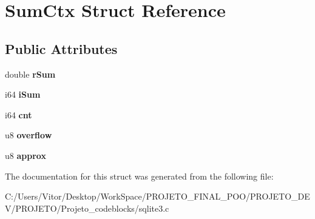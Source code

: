 \hypertarget{struct_sum_ctx}{\section{Sum\-Ctx Struct Reference}
\label{struct_sum_ctx}
}
\subsection*{Public Attributes}
\begin{DoxyCompactItemize}
\item 
\hypertarget{struct_sum_ctx_a1774080b9bcada2f4e867eaf40763f41}{double {\bfseries r\-Sum}}\label{struct_sum_ctx_a1774080b9bcada2f4e867eaf40763f41}

\item 
\hypertarget{struct_sum_ctx_ace6196fb30ebc0687997a723d55683db}{i64 {\bfseries i\-Sum}}\label{struct_sum_ctx_ace6196fb30ebc0687997a723d55683db}

\item 
\hypertarget{struct_sum_ctx_ada00261fe604a7cc6719fdcd8bb5914c}{i64 {\bfseries cnt}}\label{struct_sum_ctx_ada00261fe604a7cc6719fdcd8bb5914c}

\item 
\hypertarget{struct_sum_ctx_a3b14a5da00584aff08314d5e9ddbe9ea}{u8 {\bfseries overflow}}\label{struct_sum_ctx_a3b14a5da00584aff08314d5e9ddbe9ea}

\item 
\hypertarget{struct_sum_ctx_a035a2a22271fee066d9a92d12fe3b9a5}{u8 {\bfseries approx}}\label{struct_sum_ctx_a035a2a22271fee066d9a92d12fe3b9a5}

\end{DoxyCompactItemize}


The documentation for this struct was generated from the following file\-:\begin{DoxyCompactItemize}
\item 
C\-:/\-Users/\-Vitor/\-Desktop/\-Work\-Space/\-P\-R\-O\-J\-E\-T\-O\-\_\-\-F\-I\-N\-A\-L\-\_\-\-P\-O\-O/\-P\-R\-O\-J\-E\-T\-O\-\_\-\-D\-E\-V/\-P\-R\-O\-J\-E\-T\-O/\-Projeto\-\_\-codeblocks/sqlite3.\-c\end{DoxyCompactItemize}
